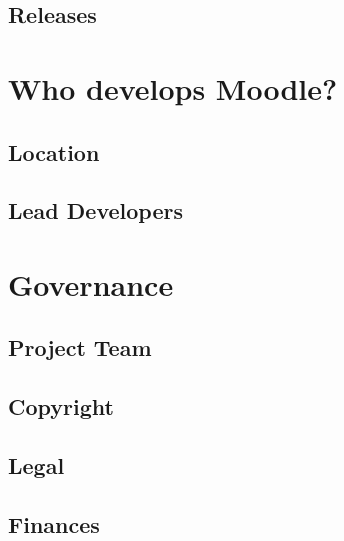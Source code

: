 \documentclass{article}
\begin{document}
\subsection{Releases} %
\label{sub:releases}



\section{Who develops Moodle?} %
\label{sec:who_develops_moodle_}

\subsection{Location} %
\label{sub:location}


\subsection{Lead Developers} %
\label{sub:lead_developers}


\section{Governance} %
\label{sec:governance}

\subsection{Project Team} %
\label{sub:project_team}


\subsection{Copyright} %
\label{sub:copyright}


\subsection{Legal} %
\label{sub:legal}


\subsection{Finances} %
\label{sub:finances}
\end{document}
